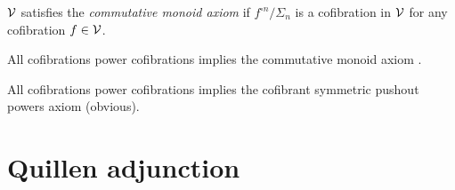 \documentclass[a4paper,10pt
,draft
]{article}%
\renewcommand{\1}{\eta}%
\begin{document}
\begin{definition}
      $\mathcal V$ satisfies the \textit{commutative monoid axiom} if $f^{\square n}/\Sigma_n$ is a cofibration in $\mathcal V$ for any cofibration $f \in \mathcal V$.
\end{definition}

\begin{lemma}
      All cofibrations power cofibrations implies the commutative monoid axiom \cite[Lemma 4.5.4.11]{Lur}.

      All cofibrations power cofibrations implies the cofibrant symmetric pushout powers axiom (obvious).
\end{lemma}








\newpage

\section{Quillen adjunction}
\end{document}
